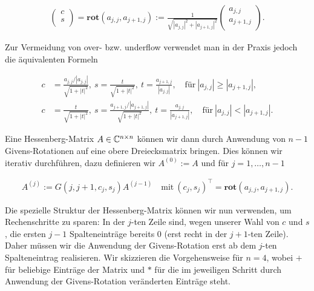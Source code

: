 \documentclass{article}
\theoremstyle{plain}
\begin{document}
\begin{align*}
\left(\begin{array}{c}
    c \\
    s \\
\end{array}\right)
=
\textbf{rot}(a_{j,j},a_{j+1,j})
:=
\frac{1}{\sqrt{|a_{j,j}|^2 + |a_{j+1,j}|^2}}
\left(\begin{array}{c}
a_{j,j} \\
a_{j+1,j} \\
\end{array}\right).
\end{align*}

Zur Vermeidung von over- bzw. underflow verwendet man in der Praxis jedoch die äquivalenten Formeln

\begin{align*}
	c &= \frac{a_{j,j} / |a_{j,j}|}{\sqrt{1+|t|^2}},~
	s = \frac{t}{\sqrt{1 +|t|^2}},~
	t = \frac{a_{j+1,j}}{|a_{j,j}|}, \quad
	\text{für}~ |a_{j,j}| \geq |a_{j+1,j}|, \\
	c &= \frac{t}{\sqrt{1 +|t|^2}},~
	s = \frac{a_{j+1,j} / |a_{j+1,j}|}{\sqrt{1+|t|^2}},~
	t = \frac{a_{j,j}}{|a_{j+1,j}|}, \quad
	\text{für}~ |a_{j,j}| < |a_{j+1,j}|.
\end{align*}

Eine Hessenberg-Matrix $A \in \mathbb{C}^{n\times n}$ können wir dann durch Anwendung von $n-1$ Givens-Rotationen auf eine obere Dreiecksmatrix bringen. Dies können wir iterativ durchführen, dazu definieren wir $A^{(0)} := A$ und für $j = 1,\dots, n-1$

\begin{align*}
	A^{(j)} :=
	G(j, j+1, c_j, s_j)A^{(j-1)} \quad
	\text{mit}~
	(c_j, s_j)^\top  = \textbf{rot}(a_{j,j},a_{j+1,j}).
\end{align*}

Die spezielle Struktur der Hessenberg-Matrix können wir nun verwenden, um Rechenschritte zu sparen: In der $j$-ten Zeile sind, wegen unserer Wahl von $c$ und $s$, die ersten $j-1$ Spalteneinträge bereits $0$ (erst recht in der $j+1$-ten Zeile). Daher müssen wir die Anwendung der Givens-Rotation erst ab dem $j$-ten Spalteneintrag realisieren. Wir skizzieren die Vorgehensweise für $n=4$, wobei $+$ für beliebige Einträge der Matrix und $*$ für die im jeweiligen Schritt durch Anwendung der Givens-Rotation veränderten Einträge steht.
\end{document}
